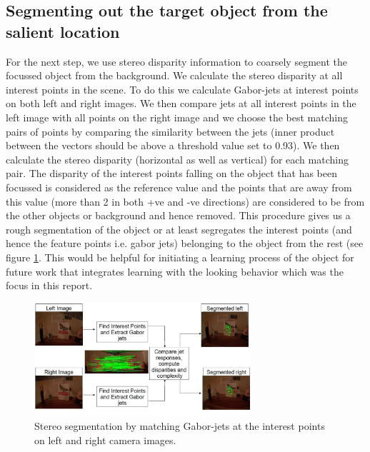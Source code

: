\documentclass[conference]{IEEEtran}
\begin{document}
\subsection{Segmenting out the target object from the salient location}
For the next step, we use stereo disparity information to coarsely
segment the focussed object from the background. We calculate the
stereo disparity at all interest points in the scene. To do this we
calculate Gabor-jets at interest points on both left and right
images. We then compare jets at all interest points in the left image
with all points on the right image and we choose the best matching
pairs of points by comparing the similarity between the jets (inner
product between the vectors should be above a threshold value set to
0.93). We then calculate the stereo disparity (horizontal as well as
vertical) for each matching pair. The disparity of the interest points
falling on the object that has been focussed is considered as the
reference value and the points that are away from this value (more
than 2 in both +ve and -ve directions) are considered to be from the
other objects or background and hence removed. This procedure gives us
a rough segmentation of the object or at least segregates the interest
points (and hence the feature points i.e. gabor jets) belonging to the
object from the rest (see figure \ref{fig:matching}. This would be
helpful for initiating a learning process of the object for future
work that integrates learning with the looking behavior which was the
focus in this report.
\begin{figure} [!tbp]
\centering
\includegraphics[width=8.0cm]{matching1.jpg}
\caption{Stereo segmentation by matching Gabor-jets at the interest
  points on left and right camera images.}
\label{fig:matching}
\end{figure}


\end{document}
